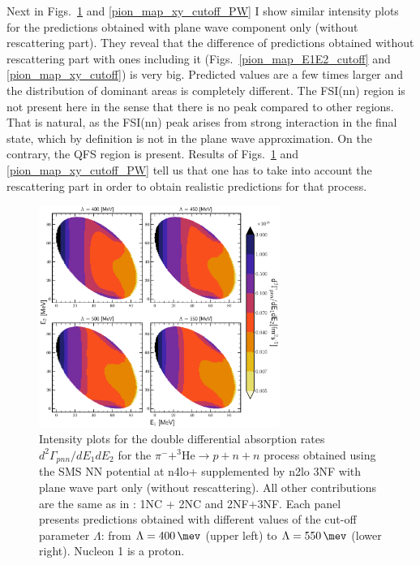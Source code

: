     Next in Figs.~\ref{pion_map_E1E2_cutoff_PW} and \ref{pion_map_xy_cutoff_PW} 
    I show similar intensity plots for the predictions obtained with plane wave component only (without rescattering part).
    They reveal that
    the difference of predictions obtained without rescattering part with ones including it
    (Figs.~\ref{pion_map_E1E2_cutoff} and \ref{pion_map_xy_cutoff}) is very big. 
    Predicted values are a few times larger and the distribution of dominant areas is completely different.
    The FSI(nn) region is not present here
    in the sense that there is no peak compared to other regions.
    That is natural, as the FSI(nn) peak arises from strong interaction in the final state,
    which by definition is not in the plane wave approximation.
    On the contrary, the QFS region is present.
    Results of Figs.~\ref{pion_map_E1E2_cutoff_PW} and \ref{pion_map_xy_cutoff_PW}
    tell us that one has to take into account the rescattering part in order to obtain
    realistic predictions for that process.  

    \begin{figure}[h]
        \begin{center}
        \includegraphics[width=0.7\textwidth]{PlotData/PION/Dalitz_maps/figures/Dalitz_map_pnn_E1E2_cutofs_PWIAS.pdf}
        \end{center}
        \caption{Intensity plots for the double differential absorption rates
        $d^2 \Gamma_{pnn}/dE_1dE_2$ for the $\pi^- + ^3\text{He} \rightarrow p + n + n$
        process obtained using the SMS NN potential at \gls{n4lo+} supplemented by \gls{n2lo} 3NF
        with plane wave part only (without rescattering).
        All other contributions are the same as in : 1NC + 2NC and 2NF+3NF.
        Each panel presents predictions obtained with different values of the cut-off parameter $\Lambda$:
        from $\Lambda=\SI{400}{\mev}$ (upper left) to $\Lambda=\SI{550}{\mev}$ (lower right). Nucleon 1 is a proton.}
        \label{pion_map_E1E2_cutoff_PW}
    \end{figure}


